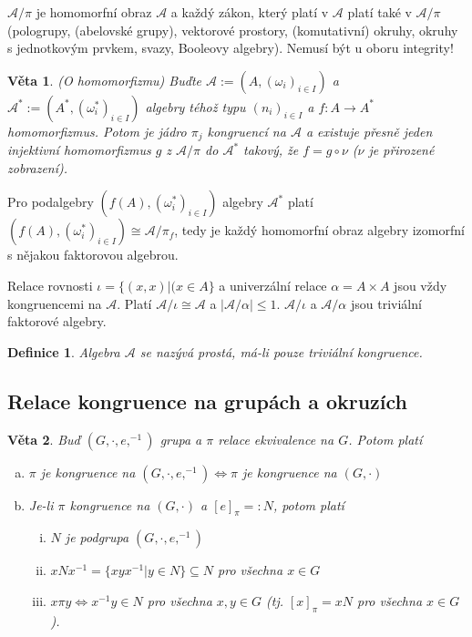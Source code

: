 \documentclass[a4paper, 11pt]{report}
\newtheorem{mydef}{Definice}[chapter]
\newtheorem{veta}{Věta}
\begin{document}
$\mathcal{A}/\pi$ je homomorfní obraz $\mathcal{A}$ a každý zákon, který platí v $\mathcal{A}$ platí také v $\mathcal{A}/\pi$ (pologrupy, (abelovské grupy), vektorové prostory, (komutativní) okruhy, okruhy s jednotkovým prvkem, svazy, Booleovy algebry). Nemusí být u oboru integrity!

\begin{veta}
(O homomorfizmu) Buďte $\mathcal{A} := (A, (\omega_i)_{i \in I})$ a  $\mathcal{A^*} := (A^*, (\omega_i^*)_{i \in I})$ algebry téhož typu $(n_i)_{i \in I}$ a $f: A \to A^*$ homomorfizmus. Potom je jádro $\pi_j$ kongruencí na $\mathcal{A}$ a existuje přesně jeden injektivní homomorfizmus $g$ z $\mathcal{A}/\pi$ do $\mathcal{A}^*$ takový, že $f = g \circ \nu$ ($\nu$ je přirozené zobrazení).
\end{veta}

Pro podalgebry $(f(A), (\omega_i^*)_{i \in I})$ algebry $\mathcal{A}^*$ platí $(f(A), (\omega_i^*)_{i \in I}) \cong \mathcal{A}/\pi_f$, tedy je každý homomorfní obraz algebry izomorfní s nějakou faktorovou algebrou.

Relace rovnosti $\iota = \{(x, x) | (x \in A\}$ a univerzální relace $\alpha = A \times A$ jsou vždy kongruencemi na $\mathcal{A}$. Platí $\mathcal{A}/\iota \cong \mathcal{A}$ a $|\mathcal{A}/\alpha| \leq 1$. $\mathcal{A}/\iota$ a $\mathcal{A}/\alpha$ jsou triviální faktorové algebry.

\begin{mydef}
Algebra $\mathcal{A}$ se nazývá prostá, má-li pouze triviální kongruence.
\end{mydef}

\subsection{Relace kongruence na grupách a okruzích}

\begin{veta}
Buď $(G, \cdot, e, ^{-1})$ grupa a $\pi$ relace ekvivalence na $G$. Potom platí
\begin{enumerate}[a)]
	\item $\pi$ je kongruence na $(G, \cdot, e, ^{-1}) \Leftrightarrow \pi$ je kongruence na $(G, \cdot)$
	\item Je-li $\pi$ kongruence na $(G, \cdot)$ a $[e]_\pi =: N$, potom platí
	\begin{enumerate}[i)]
		\item $N$ je podgrupa $(G, \cdot, e, ^{-1})$
		\item $x N x^{-1} = \{x y x^{-1} | y \in N\} \subseteq N$ pro všechna $x \in G$ 
		\item $x \pi y \Leftrightarrow x^{-1} y \in N$ pro všechna $x, y \in G$ (tj. $[x]_\pi = x N$ pro všechna $x \in G$).
	\end{enumerate}
\end{enumerate}
\end{veta}
\end{document}
